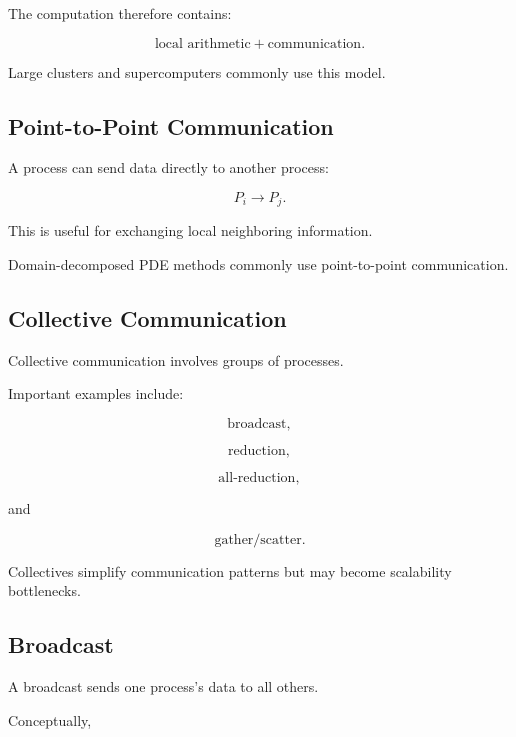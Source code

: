 The computation therefore contains:

\[
\boxed{
\text{local arithmetic}
+
\text{communication}.
}
\]

Large clusters and supercomputers commonly use this model.

\subsection{Point-to-Point Communication}
\label{subsec:hpmc-point-to-point}

A process can send data directly to another process:

\[
\boxed{
P_i
\rightarrow
P_j.
}
\]

This is useful for exchanging local neighboring information.

Domain-decomposed PDE methods commonly use point-to-point communication.

\subsection{Collective Communication}
\label{subsec:hpmc-collectives}

Collective communication involves groups of processes.

Important examples include:

\[
\boxed{
\text{broadcast},
}
\]

\[
\boxed{
\text{reduction},
}
\]

\[
\boxed{
\text{all-reduction},
}
\]

and

\[
\boxed{
\text{gather/scatter}.
}
\]

Collectives simplify communication patterns but may become scalability
bottlenecks.

\subsection{Broadcast}
\label{subsec:hpmc-broadcast}

A broadcast sends one process's data to all others.

Conceptually,

